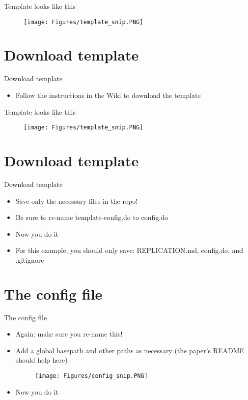 \documentclass[xcolor={dvipsnames}]{beamer}
\theoremstyle{definition}
\begin{document}
\begin{frame}{Template looks like this}
\begin{figure}
    \centering
    \texttt{[image: Figures/template\_snip.PNG]}
\end{figure}
\end{frame}

\section{Download template}
\begin{frame}{Download template}
\begin{itemize}
    \item Follow the instructions in the Wiki to download the template
\end{itemize}
\end{frame}

\begin{frame}{Template looks like this}
\begin{figure}
    \centering
    \texttt{[image: Figures/template\_snip.PNG]}
\end{figure}
\end{frame}

\section{Download template}
\begin{frame}{Download template}
\begin{itemize}
    \item Save only the necessary files in the repo!
    \item Be sure to re-name template-config.do to config.do
    \pause
    \item Now you do it
    \pause
    \item For this example, you should only save: REPLICATION.md, config.do, and .gitignore 
\end{itemize}
\end{frame}

\section{The config file}
\begin{frame}{The config file}
\begin{itemize}
    \item Again: make sure you re-name this!
    \item Add a global basepath and other paths as necessary (the paper's README should help here)
    \begin{figure}
        \centering
        \texttt{[image: Figures/config\_snip.PNG]}
    \end{figure}
    \pause
    \item Now you do it
\end{itemize}
\end{frame}
\end{document}
